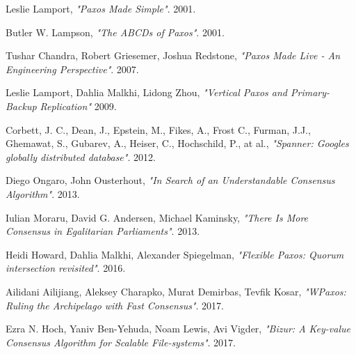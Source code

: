 \documentclass[12pt]{article}
\theoremstyle{definition}
\begin{document}
\begin{thebibliography}{9}

  Leslie Lamport,
  \emph{"Paxos Made Simple"}.
  2001.

  Butler W. Lampson,
  \emph{"The ABCDs of Paxos"}.
  2001.

  Tushar Chandra, Robert Griesemer, Joshua Redstone,
  \emph{"Paxos Made Live - An Engineering Perspective"}.
  2007.

  Leslie Lamport, Dahlia Malkhi, Lidong Zhou,
  \emph{"Vertical Paxos and Primary-Backup Replication"}
  2009.

  Corbett, J. C., Dean, J., Epstein, M., Fikes, A., Frost C., Furman, J.J., Ghemawat, S., Gubarev, A., Heiser, C., Hochschild, P., at al.,
  \emph{"Spanner: Googles globally distributed database"}.
  2012.

  Diego Ongaro, John Ousterhout,
  \emph{"In Search of an Understandable Consensus Algorithm"}.
  2013.

  Iulian Moraru, David G. Andersen, Michael Kaminsky,
  \emph{"There Is More Consensus in Egalitarian Parliaments"}.
  2013.

  Heidi Howard, Dahlia Malkhi, Alexander Spiegelman,
  \emph{"Flexible Paxos: Quorum intersection revisited"}.
  2016.

  Ailidani Ailijiang, Aleksey Charapko, Murat Demirbas, Tevfik Kosar,
  \emph{"WPaxos: Ruling the Archipelago with Fast Consensus"}.
  2017.

  Ezra N. Hoch, Yaniv Ben-Yehuda, Noam Lewis, Avi Vigder,
  \emph{"Bizur: A Key-value Consensus Algorithm for Scalable File-systems"}.
  2017.

\end{thebibliography}
\end{document}
